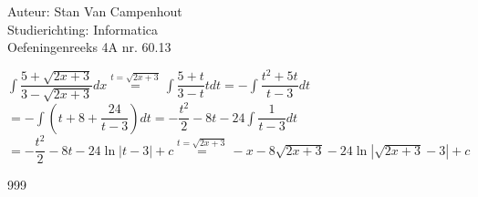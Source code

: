 \documentclass[a4paper]{article}
\begin{document}
  
\noindent \large Auteur: Stan Van Campenhout \\
\noindent \large Studierichting:  Informatica\\
\noindent \large Oefeningenreeks 4A nr. 60.13\\

\medskip

\normalsize

$ \displaystyle\int\dfrac{5+\sqrt{2x+3}}{3-\sqrt{2x+3}}dx \stackrel{t = \sqrt{2x+3}}{=} \displaystyle\int\dfrac{5+t}{3-t}tdt
= -\displaystyle\int\dfrac{t^2+5t}{t-3}dt $\\

$ = -\displaystyle\int\left(t+8+\dfrac{24}{t-3}\right)dt = -\dfrac{t^2}{2}-8t-24\displaystyle\int\dfrac{1}{t-3}dt $\\

$ =  -\dfrac{t^2}{2}-8t-24\ln|t-3| + c \stackrel{t = \sqrt{2x+3}}{=} - x - 8\sqrt{2x+3}-24\ln|\sqrt{2x+3}-3| + c $\\

\begin{thebibliography}{999}
\end{thebibliography}
\end{document}
